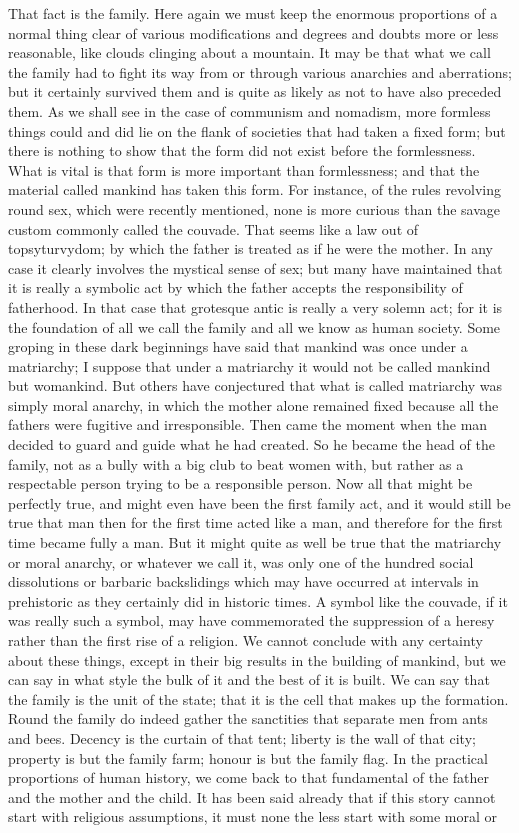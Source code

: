 That fact is the family. Here again we must keep the enormous proportions of a normal thing clear of various modifications and degrees and doubts more or less reasonable, like clouds clinging about a mountain. It may be that what we call the family had to fight its way from or through various anarchies and aberrations; but it certainly survived them and is quite as likely as not to have also preceded them. As we shall see in the case of communism and nomadism, more formless things could and did lie on the flank of societies that had taken a fixed form; but there is nothing to show that the form did not exist before the formlessness. What is vital is that form is more important than formlessness; and that the material called mankind has taken this form. For instance, of the rules revolving round sex, which were recently mentioned, none is more curious than the savage custom commonly called the couvade. That seems like a law out of topsyturvydom; by which the father is treated as if he were the mother. In any case it clearly involves the mystical sense of sex; but many have maintained that it is really a symbolic act by which the father accepts the responsibility of fatherhood. In that case that grotesque antic is really a very solemn act; for it is the foundation of all we call the family and all we know as human society. Some groping in these dark beginnings have said that mankind was once under a matriarchy; I suppose that under a matriarchy it would not be called mankind but womankind. But others have conjectured that what is called matriarchy was simply moral anarchy, in which the mother alone remained fixed because all the fathers were fugitive and irresponsible. Then came the moment when the man decided to guard and guide what he had created. So he became the head of the family, not as a bully with a big club to beat women with, but rather as a respectable person trying to be a responsible person. Now all that might be perfectly true, and might even have been the first family act, and it would still be true that man then for the first time acted like a man, and therefore for the first time became fully a man. But it might quite as well be true that the matriarchy or moral anarchy, or whatever we call it, was only one of the hundred social dissolutions or barbaric backslidings which may have occurred at intervals in prehistoric as they certainly did in historic times. A symbol like the couvade, if it was really such a symbol, may have commemorated the suppression of a heresy rather than the first rise of a religion. We cannot conclude with any certainty about these things, except in their big results in the building of mankind, but we can say in what style the bulk of it and the best of it is built. We can say that the family is the unit of the state; that it is the cell that makes up the formation. Round the family do indeed gather the sanctities that separate men from ants and bees. Decency is the curtain of that tent; liberty is the wall of that city; property is but the family farm; honour is but the family flag. In the practical proportions of human history, we come back to that fundamental of the father and the mother and the child. It has been said already that if this story cannot start with religious assumptions, it must none the less start with some moral or 